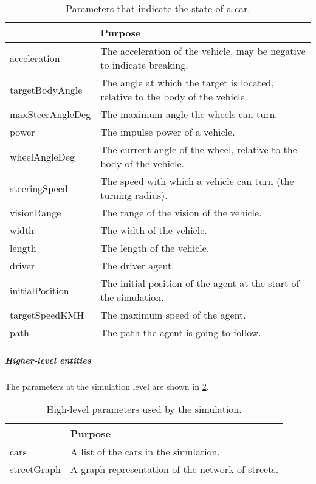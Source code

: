 	\begin{table}[H]
		\centering
		\begin{tabularx}{\textwidth}{>{\ttfamily}lX}
			\toprule
			\normalfont{Parameter}	& Purpose \\ 
			\midrule
			acceleration 			& The acceleration of the vehicle, may be negative to indicate breaking.\\ 
			targetBodyAngle 		& The angle at which the target is located, relative to the body of the vehicle. \\ 
			maxSteerAngleDeg 		& The maximum angle the wheels can turn. \\ 
			power 					& The impulse power of a vehicle. \\ 
			wheelAngleDeg 			& The current angle of the wheel, relative to the body of the vehicle. \\ 
			steeringSpeed 			& The speed with which a vehicle can turn (the turning radius). \\ 
			visionRange 			& The range of the vision of the vehicle. \\ 
			width 					& The width of the vehicle. \\ 
			length 					& The length of the vehicle. \\ 
			driver 					& The driver agent. \\ 
			initialPosition 		& The initial position of the agent at the start of the simulation. \\ 
			targetSpeedKMH			& The maximum speed of the agent. \\ 
			path					& The path the agent is going to follow. \\ 
			\bottomrule
		\end{tabularx}
		\caption{Parameters that indicate the state of a car.}
		\label{tab:par:method:model:overview:state:lowlevel:car}
	\end{table}

	\subparagraph{Higher-level entities}
	The parameters at the simulation level are shown in \cref{tab:par:method:model:overview:state:highlevel:sim}.
	
	\begin{table}[H]
		\centering
		\begin{tabularx}{\textwidth}{>{\ttfamily}lX}
			\toprule
			\normalfont{Parameter}	& Purpose \\  
			\midrule
			cars 					& A list of the cars in the simulation. \\ 
			streetGraph		 		& A graph representation of the network of streets. \\ 
			\bottomrule
		\end{tabularx}
		\caption{High-level parameters used by the simulation.}
		\label{tab:par:method:model:overview:state:highlevel:sim}
	\end{table}


